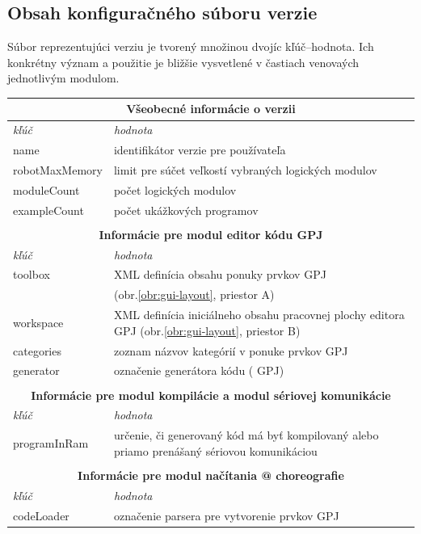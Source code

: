 \subsection{Obsah konfiguračného súboru verzie}
Súbor reprezentujúci verziu je tvorený množinou dvojíc kľúč--hodnota. Ich konkrétny význam a použitie je bližšie vysvetlené v častiach venovaých jednotlivým modulom.

\begin{table}\footnotesize
\centering
\begin{tabular}{ |p{3.8cm}|p{10cm}|  }
 \hline
	\multicolumn{2}{|c|}{\textbf{Všeobecné informácie o verzii}} \\
 \hline
	\textit{kľúč} & \textit{hodnota}\\
 \hline
	name&identifikátor verzie pre používateľa\\
	robotMaxMemory&limit pre súčet veľkostí vybraných logických modulov\\
	moduleCount&počet logických modulov\\
	exampleCount&počet ukážkových programov\\
 \hline

 \multicolumn{2}{c}{} \\
 \multicolumn{2}{c}{\textbf{Informácie pre modul editor kódu GPJ}} \\
 \hline
	\textit{kľúč} & \textit{hodnota}\\
 \hline
 	toolbox&XML definícia obsahu ponuky prvkov GPJ\\
	&(obr.\ref{obr:gui-layout}, priestor A)\\
 	workspace&XML definícia iniciálneho obsahu pracovnej plochy editora GPJ (obr.\ref{obr:gui-layout}, priestor B)\\
 	categories&zoznam názvov kategórií v ponuke prvkov GPJ\\
 	generator&označenie generátora kódu (\uv{prekladača} GPJ)\\
 \hline

 \multicolumn{2}{c}{} \\
 \multicolumn{2}{c}{\textbf{Informácie pre modul kompilácie a modul sériovej komunikácie}} \\
 \hline
	\textit{kľúč} & \textit{hodnota}\\
 \hline
	programInRam&určenie, či generovaný kód má byť kompilovaný alebo priamo prenášaný sériovou komunikáciou\\
 \hline

 \multicolumn{2}{c}{} \\
 \multicolumn{2}{c}{\textbf{Informácie pre modul načítania @ choreografie}} \\
 \hline
	\textit{kľúč} & \textit{hodnota}\\
 \hline
	codeLoader&označenie parsera pre vytvorenie prvkov GPJ\\
 \hline


\end{tabular}
\end{table}
